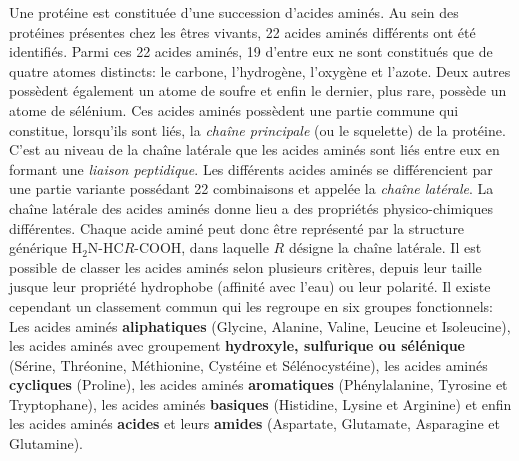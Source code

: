 Une protéine est constituée d'une succession d'acides aminés. Au sein des protéines présentes chez les êtres vivants, 22 acides aminés différents ont été identifiés. Parmi ces 22 acides aminés, 19 d'entre eux ne sont constitués que de quatre atomes distincts: le carbone, l'hydrogène, l'oxygène et l'azote. Deux autres possèdent également un atome de soufre et enfin le dernier, plus rare, possède un atome de sélénium. Ces acides aminés possèdent une partie commune qui constitue, lorsqu'ils sont liés, la \textit{chaîne principale} (ou le squelette) de la protéine. C'est au niveau de la chaîne latérale que les acides aminés sont liés entre eux en formant une \textit{liaison peptidique}. Les différents acides aminés se différencient par une partie variante possédant 22 combinaisons et appelée la \textit{chaîne latérale}. La chaîne latérale des acides aminés donne lieu a des propriétés physico-chimiques différentes. Chaque acide aminé peut donc être représenté par la structure générique H$_{2}$N-HC$R$-COOH, dans laquelle $R$ désigne la chaîne latérale. 
Il est possible de classer les acides aminés selon plusieurs critères, depuis leur taille jusque leur propriété hydrophobe (affinité avec l'eau) ou leur polarité. Il existe cependant un classement commun qui les regroupe en six groupes fonctionnels: Les acides aminés \textbf{aliphatiques} (Glycine, Alanine, Valine, Leucine et Isoleucine), les acides aminés avec groupement \textbf{hydroxyle, sulfurique ou sélénique} (Sérine, Thréonine, Méthionine, Cystéine et Sélénocystéine), les acides aminés \textbf{cycliques} (Proline), les acides aminés \textbf{aromatiques} (Phénylalanine, Tyrosine et Tryptophane), les acides aminés \textbf{basiques} (Histidine, Lysine et Arginine) et enfin les acides aminés \textbf{acides} et leurs \textbf{amides} (Aspartate, Glutamate, Asparagine et Glutamine).

